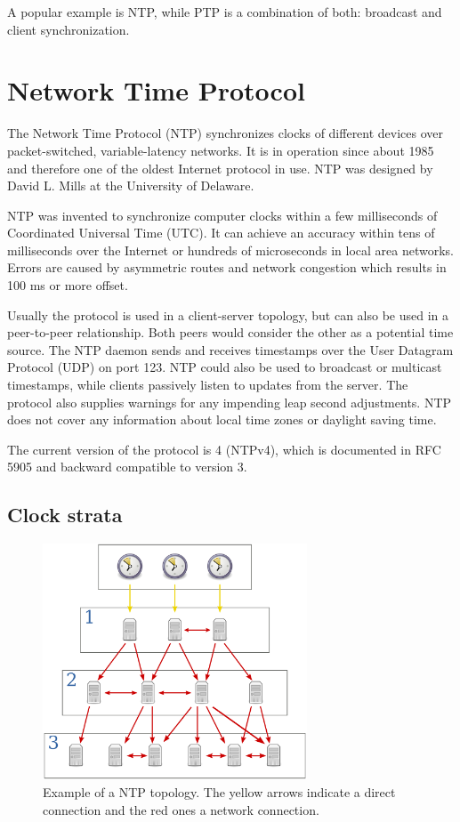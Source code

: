 A popular example is NTP, while PTP is a combination of both: broadcast and client synchronization.

\section{Network Time Protocol}

The Network Time Protocol (NTP) synchronizes clocks of different devices over packet-switched, variable-latency networks.\cite{mills_2010} It is in operation since about 1985 and therefore one of the oldest Internet protocol in use. NTP was designed by David L. Mills at the University of Delaware.

NTP was invented to synchronize computer clocks within a few milliseconds of Coordinated Universal Time (UTC). It can achieve an accuracy within tens of milliseconds over the Internet or hundreds of microseconds in local area networks. Errors are caused by asymmetric routes and network congestion which results in 100 ms or more offset.

Usually the protocol is used in a client-server topology, but can also be used in a peer-to-peer relationship. Both peers would consider the other as a potential time source. The NTP daemon sends and receives timestamps over the User Datagram Protocol (UDP) on port 123. NTP could also be used to broadcast or multicast timestamps, while clients passively listen to updates from the server. The protocol also supplies warnings for any impending leap second adjustments. NTP does not cover any information about local time zones or daylight saving time.

The current version of the protocol is 4 (NTPv4), which is documented in RFC 5905 and backward compatible to version 3.

\subsection{Clock strata}

\begin{figure}[tb]
	\centering
	\includegraphics[width=0.7\textwidth]{figures/ntp_strata.png}
	\caption{Example of a NTP topology. The yellow arrows indicate a direct connection and the red ones a network connection.}
	\label{fig:ntp_strata}
\end{figure}

